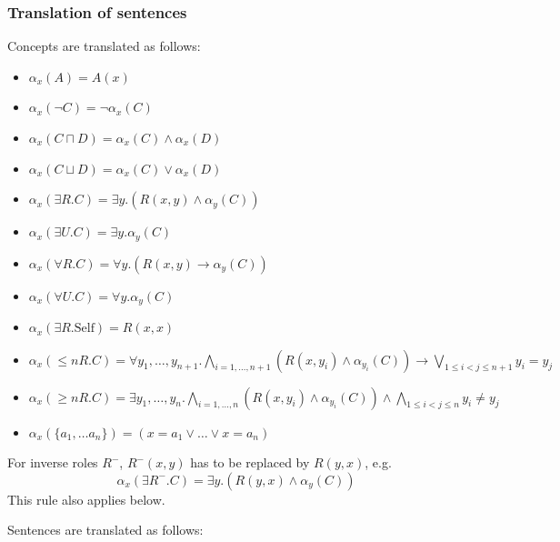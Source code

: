 \documentclass[10pt,fleqn,final]{scrreprt}
\newcommand{\sssclause}[1]{\subsubsection{#1}}
\newenvironment{definitions}[0]{\medskip }{}
\begin{document}
\begin{definitions}
\sssclause{Translation of sentences}

Concepts are translated as follows:
\begin{itemize}
 \item $\alpha_x(A) = A(x)$
 \item $\alpha_x(\lnot C) = \lnot \alpha_x (C)$
 \item $\alpha_x(C \sqcap D) = \alpha_x(C) \land \alpha_x(D)$
 \item $\alpha_x(C \sqcup D) = \alpha_x(C) \lor \alpha_x(D)$ 
 \item $\alpha_x(\exists R.C) = \exists y . (R(x,y) \land \alpha_y(C))$
 \item $\alpha_x(\exists U.C) = \exists y . \alpha_y(C)$
 \item $\alpha_x(\forall R.C) = \forall y . (R(x,y) \rightarrow \alpha_y(C))$
 \item $\alpha_x(\forall U.C) = \forall y . \alpha_y(C)$
 \item $\alpha_x(\exists R.\text{Self}) = R(x,x)$
 \item $\alpha_x(\leq n R. C) = \forall y_1,\ldots,y_{n+1} .  \bigwedge_{i=1,\ldots,n+1}(R(x,y_i) \land \alpha_{y_i}(C)) \rightarrow\bigvee_{1\leq i<j\leq n+1}y_i = y_j$
 \item $\alpha_x(\geq n R. C) = \exists y_1,\ldots,y_n . \bigwedge_{i=1,\ldots,n}(R(x,y_i) \land \alpha_{y_i}(C)) \wedge \bigwedge_{1\leq i<j\leq n}y_i\not= y_j $
 \item $\alpha_x(\{a_1, \ldots a_n \}) = (x=a_1\vee \ldots \vee x=a_n)$
\end{itemize}

For inverse roles $R^-$, $R^-(x,y)$ has to be replaced by $R(y,x)$, e.g.
 $$\alpha_x(\exists R^-.C) = \exists y . (R(y,x) \land \alpha_y(C))$$
This rule also applies below.


Sentences are translated as follows:


\end{definitions}
\end{document}
